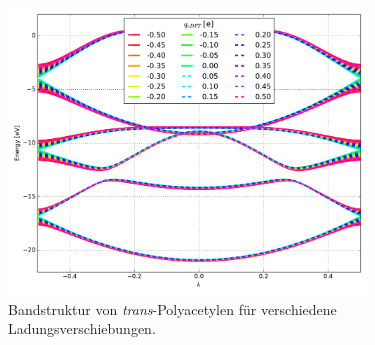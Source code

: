 \begin{frame}
\begin{figure}
	\centering
	\includegraphics[width = 9.5cm]{Images/polyacetylene/charging/band_structure_q_1}
	\caption{Bandstruktur von \emph{trans}-Polyacetylen für verschiedene Ladungsverschiebungen.}
	\label{image_polyacetylene_band_structure_charging}
\end{figure}
\end{frame}

